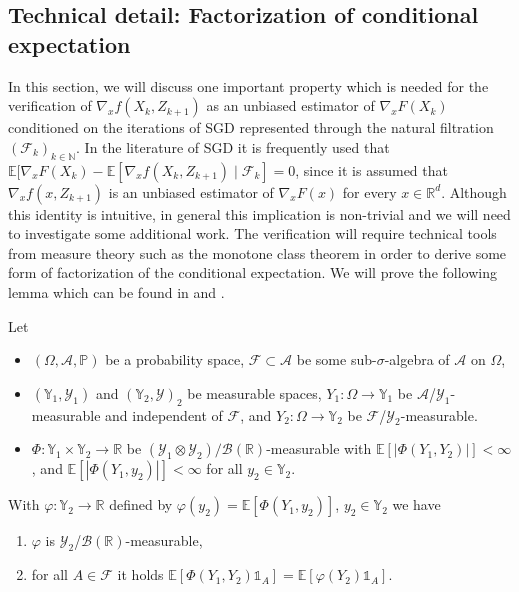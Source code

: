 \documentclass[12pt,openany]{book}
\theoremstyle{definition}
\theoremstyle{definition}
\newcommand{\E}{\mathbb{E}}
\newcommand{\N}{\mathbb{N}}
\newcommand{\R}{\mathbb{R}}
\begin{document}
\subsection{Technical detail: Factorization of conditional expectation}
In this section, we will discuss one important property which is needed for the verification of $\nabla_x f(X_k,Z_{k+1})$ as an unbiased estimator of $\nabla_x F(X_k)$ conditioned on the iterations of SGD represented through the natural filtration $(\mathcal F_k)_{k\in\N}$. In the literature of SGD it is frequently used that $\E[\nabla_x F(X_k)-\E[\nabla_x f(X_k,Z_{k+1})\mid \mathcal F_k]=0$, since it is assumed that $\nabla_x f(x,Z_{k+1})$ is an unbiased estimator of $\nabla_x F(x)$ for every $x\in\R^d$. Although this identity is intuitive, in general this implication is non-trivial and we will need to investigate some additional work. The verification will require technical tools from measure theory such as the monotone class theorem in order to derive some form of factorization of the conditional expectation. We will prove the following lemma which can be found in \cite[Proposition~1.12]{da1992stochastic} and \cite[Corollary~2.9]{Jentzen2020}.

\begin{lemma}\label{lem:condexp_factorization}
Let
\begin{itemize}
\item $(\Omega,\mathcal A,\mathbb P)$ be a probability space, $\mathcal F\subset \mathcal A$ be some sub-$\sigma$-algebra of $\mathcal A$ on $\Omega$,
\item $(\mathbb Y_1,\mathcal Y_1)$ and $(\mathbb Y_2,\mathcal Y)_2$ be measurable spaces, $Y_1:\Omega\to\mathbb Y_1$ be $\mathcal A$/$\mathcal Y_1$-measurable and independent of $\mathcal F$, and $Y_2:\Omega\to\mathbb Y_2$ be $\mathcal F$/$\mathcal Y_2$-measurable.
\item $\Phi:\mathbb Y_1\times \mathbb Y_2\to\R$ be $(\mathcal Y_1\otimes \mathcal Y_2)/\mathcal B(\R)$-measurable with $\E[|\Phi(Y_1,Y_2)|]<\infty$, and $\E[|\Phi(Y_1,y_2)|]<\infty$ for all $y_2\in\mathbb Y_2$.
\end{itemize}
With $\varphi:\mathbb Y_2\to\R$ defined by $\varphi(y_2) = \E[\Phi(Y_1,y_2)]$, $y_2\in\mathbb Y_2$  we have
\begin{enumerate}
\item $\varphi$ is $\mathcal Y_2$/$\mathcal B(\R)$-measurable,
\item for all $A\in\mathcal F$ it holds
\(\E[\Phi(Y_1,Y_2)\mathds{1}_A] = \E[\varphi(Y_2)\mathds{1}_A]. \)
\end{enumerate}
\end{lemma}
\end{document}

